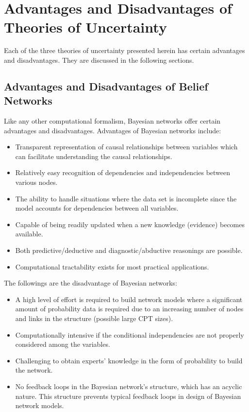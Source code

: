 \documentclass[11pt]{article}
\begin{document}
\section{Advantages and Disadvantages of Theories of Uncertainty}
\label{sec:pros-cons}

Each of the three theories of uncertainty presented herein has certain
advantages and disadvantages. They are discussed in the following sections.

\subsection{Advantages and Disadvantages of Belief Networks}

Like any other computational formalism, Bayesian networks offer certain
advantages and disadvantages. Advantages of Bayesian networks include:

\begin{itemize}
  \item Transparent representation of causal relationships between variables
  which can facilitate understanding the causal relationships.
  
  \item Relatively easy recognition of dependencies and independencies between
  various nodes.
  
  \item The ability to handle situations where the data set is incomplete since
  the model accounts for dependencies between all variables.
  
  \item Capable of being readily updated when a new knowledge (evidence) becomes
  available.
  
  \item Both predictive/deductive and diagnostic/abductive reasonings are
  possible.

  \item Computational tractability exists for most practical applications.
\end{itemize}

\noindent The followings are the disadvantage of Bayesian networks:

\begin{itemize}
  \item A high level of effort is required to build network models where a
  significant amount of probability data is required due to an increasing number
  of nodes and links in the structure (possible large CPT sizes).
  
  \item Computationally intensive if the conditional independencies are not
  properly considered among the variables.
  
  \item Challenging to obtain experts' knowledge in the form of probability to
  build the network.
  
  \item No feedback loops in the Bayesian network's structure, which has an
  acyclic nature. This structure prevents typical feedback loops in design of
  Bayesian network models.
\end{itemize}
\end{document}
